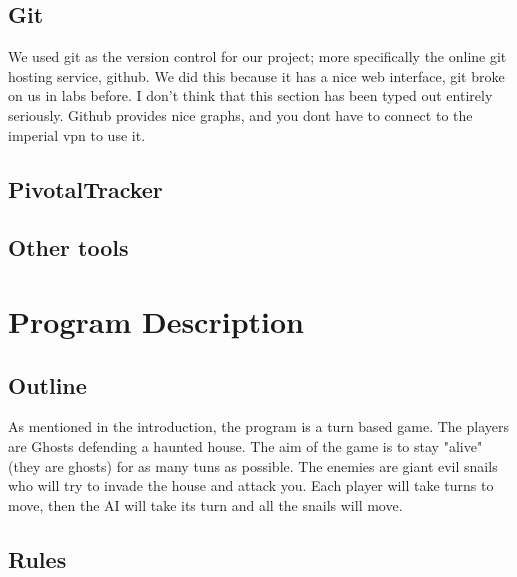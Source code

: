 \documentclass{article}
\begin{document}
\subsection{Git}
We used git as the version control for our project; more specifically the online git hosting service, github. We did this because it has a nice web interface, git broke on us in labs before. I don't think that this section has been typed out entirely seriously. Github provides nice graphs, and you dont have to connect to the imperial vpn to use it.
\subsection{PivotalTracker}
\subsection{Other tools}

\section{Program Description}
\subsection{Outline}
As mentioned in the introduction, the program is a turn based game. The players are Ghosts defending a haunted house. The aim of the game is to stay "alive" (they are ghosts) for as many tuns as possible. The enemies are giant evil snails who will try to invade the house and attack you. Each player will take turns to move, then the AI will take its turn and all the snails will move.
\subsection{Rules}
\end{document}

